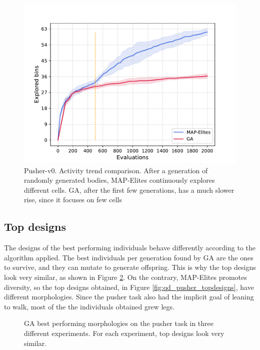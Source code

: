 \begin{figure}[H]
    \centering
    \includegraphics[scale=0.65]{images/brain_opt/pusher/comp_qd_ga_p_at}
    \caption{Pusher-v0. Activity trend comparison. After a generation of randomly generated bodies, MAP-Elites continuously explores different cells. GA, after the first few generations, has a much slower rise, since it focuses on few cells}
    \label{fig:qd_ga_pusher_at}
\end{figure}

\subsection{Top designs}
The designs of the best performing individuals behave differently according to the algorithm applied. The best individuals per generation found by GA are the ones to survive, and they can mutate to generate offspring. This is why the top designs look very similar, as shown in Figure \ref{fig:ga_pusher_topdesigns}. On the contrary, MAP-Elites promotes diversity, so the top designs obtained, in Figure \ref{fig:qd_pusher_topdesigns}, have different morphologies.
Since the pusher task also had the implicit goal of leaning to walk, most of the the individuals obtained grew legs.

\begin{figure}[H]
    \centering
    
    \caption{GA best performing morphologies on the pusher task in three different experiments. For each experiment, top designs look very similar.}
    \label{fig:ga_pusher_topdesigns}
\end{figure}

